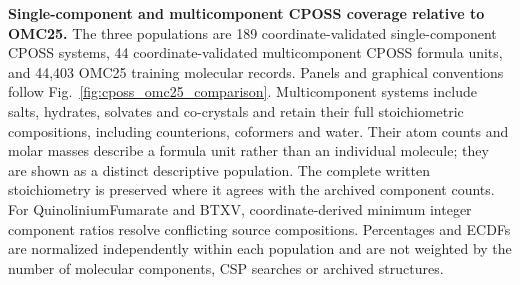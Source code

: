 \caption{\textbf{Single-component and multicomponent CPOSS coverage relative to OMC25.} The three populations are 189 coordinate-validated single-component CPOSS systems, 44 coordinate-validated multicomponent CPOSS formula units, and 44,403 OMC25 training molecular records. Panels and graphical conventions follow Fig.~\ref{fig:cposs_omc25_comparison}. Multicomponent systems include salts, hydrates, solvates and co-crystals and retain their full stoichiometric compositions, including counterions, coformers and water. Their atom counts and molar masses describe a formula unit rather than an individual molecule; they are shown as a distinct descriptive population. The complete written stoichiometry is preserved where it agrees with the archived component counts. For QuinoliniumFumarate and BTXV, coordinate-derived minimum integer component ratios resolve conflicting source compositions. Percentages and ECDFs are normalized independently within each population and are not weighted by the number of molecular components, CSP searches or archived structures.}
\label{fig:cposs_omc25_multicomponent}
